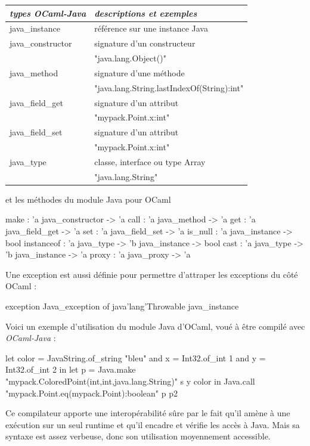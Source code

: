 \documentclass[a4paper, 11pt]{article}
\begin{document}
\begin{tabular}{|l|l|}
  \hline
  \emph{types OCaml-Java} & \emph{descriptions et exemples} \\\hline
  java\_instance & référence sur une instance Java  \\
  \hline
  java\_constructor & signature d'un constructeur  \\
  &  "java.lang.Object()" \\
  \hline
  java\_method & signature d'une méthode \\
  & "java.lang.String.lastIndexOf(String):int"\\
  \hline
  java\_field\_get & signature d'un attribut\\
  & "mypack.Point.x:int" \\
  \hline
  java\_field\_set & signature d'un attribut\\
  & "mypack.Point.x:int" \\
  \hline
  java\_type & classe, interface ou type Array\\
  & "java.lang.String"\\
  \hline
\end{tabular}

\noindent
et les méthodes du module Java\cite{module Java} pour OCaml

\begin{OCamlEx}
make : 'a java_constructor -> 'a 
call : 'a java_method -> 'a 
get : 'a java_field_get -> 'a 
set : 'a java_field_set -> 'a 
is_null : 'a java_instance -> bool 
instanceof : 'a java_type -> 'b java_instance -> bool
cast : 'a java_type -> 'b java_instance -> 'a
proxy : 'a java_proxy -> 'a
\end{OCamlEx}
Une exception est aussi définie pour permettre d'attraper les
exceptions du côté OCaml :
\begin{OCamlEx}
exception Java_exception of java'lang'Throwable java_instance
\end{OCamlEx}

\newpage
Voici un exemple d'utilisation du module Java \cite{module Java} d'OCaml, voué à être compilé avec \emph{OCaml-Java} :
\begin{OCamlEx}
let color = JavaString.of_string "bleu"
and x = Int32.of_int 1
and y = Int32.of_int 2 in
let p = Java.make "mypack.ColoredPoint(int,int,java.lang.String)" s y color 
in
   Java.call "mypack.Point.eq(mypack.Point):boolean" p p2
\end{OCamlEx}

Ce compilateur apporte une interopérabilité sûre par le fait qu'il amène à une exécution sur un seul runtime et qu'il encadre et vérifie les accès à Java.
Mais sa syntaxe est assez verbeuse, donc son utilisation moyennement accessible. 
\end{document}
